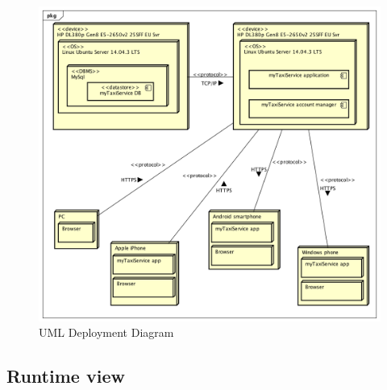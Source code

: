 \documentclass[a4paper]{article}
\begin{document}
\begin{figure}[H]
\includegraphics[width=.9\textwidth]{DeploymentDiagram}
\centering
\caption{UML Deployment Diagram}
\label{fig:deploymentsiagram}
\end{figure}

\subsection{Runtime view}

\newlength{\sequenceWidth}
\setlength{\sequenceWidth}{\textwidth}
\end{document}
